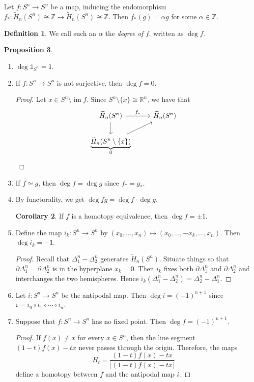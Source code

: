\documentclass[10pt,letterpaper,cm]{nupset}
\theoremstyle{definition}
\newtheorem{definition}{Definition}[subsection]
\theoremstyle{theorem}
\newtheorem{prop}[definition]{Proposition}
\newtheorem{corollary}[definition]{Corollary}
\theoremstyle{remark}
\newcommand{\R}{\mathbb{R}}
\newcommand{\Z}{\mathbb Z}
\newcommand{\1}{\mathbb{1}}
\newcommand{\0}{\vec 0}
\DeclareMathOperator{\im}{im}
\begin{document}
\smallskip

Let $f: S^n \to S^n$ be a map, inducing the endomorphism $f_{\ast} : \widetilde{H}_n(S^n) \cong \Z \to \widetilde{H}_n(S^n) \cong \Z$. Then $f_{\ast}(g) = \alpha g$ for some $\alpha \in \Z$. 

\begin{definition}
We call such an $\alpha$ the \textit{degree of $f$}, written as $\deg{f}$.
\end{definition}

\begin{prop} $ $
\begin{enumerate}
\item $\deg{\1_{S^n}}=1$.
\item If $f: S^n \to S^n$ is not surjective, then $\deg{f} = 0$.
\begin{proof}
Let $x\in S^n \setminus \im{f}$. Since $S^n \setminus \{x\} \cong \R^n$, we have that 
\[
\begin{tikzcd}
\widetilde{H}_n(S^n) \arrow[r, "f_{\ast}"] \arrow[d] & \widetilde{H}_n(S^n) \\
\underbrace{\widetilde{H}_n(S^n \setminus \{x\})}_{0} \arrow[ru]      &                     
\end{tikzcd}
\]
\end{proof}
\item If $f \simeq g$, then $\deg{f} = \deg{g}$ since $f_{\ast} = g_{\ast}$.
\item By functorality, we get $\deg{fg}= \deg{f}\cdot \deg{g}$.
\begin{corollary}
If $f$ is a homotopy equivalence, then $\deg{f}= \pm 1$.
\end{corollary}
\item Define the map $i_k : S^n \to S^n$ by $(x_0, \ldots, x_n) \mapsto (x_0, \ldots, -x_k, \ldots, x_n)$. Then $\deg{i_k} = {-1}$.
\begin{proof}
Recall that $\Delta_1^n -\Delta_2^n$ generates $\widetilde{H}_n(S^n)$. Situate things so that $\partial{\Delta_1^n} = \partial{\Delta_2^n}$ is in the hyperplane $x_k=0$. Then $i_k$ fixes both $\partial{\Delta_1^n}$ and $\partial{\Delta_2^n}$ and interchanges the two hemispheres. Hence $i_k(\Delta_1^n -\Delta_2^n)= \Delta_2^n- \Delta_1^n $.
\end{proof}
\item Let $i: S^n \to S^n$ be the antipodal map. Then $\deg{i} = ({-1})^{n+1}$ since $i= i_0 \circ i_1 \circ \cdots \circ i_n$.
\item Suppose that $f: S^n \to S^n$ has no fixed point. Then $\deg{f}= ({-1})^{n+1}$.
\begin{proof}
If $f(x) \ne x$ for every $x\in S^n$, then the line segment $(1-t)f(x) - tx$ never passes through the origin. Therefore, the maps $$H_t = \frac{ (1-t)f(x)-tx  }{\left\lvert{(1-t)f(x) -tx}\right\rvert     }$$ define a homotopy between $f$ and the antipodal map $i$.
\end{proof}
\end{enumerate}
\end{prop}
\end{document}
